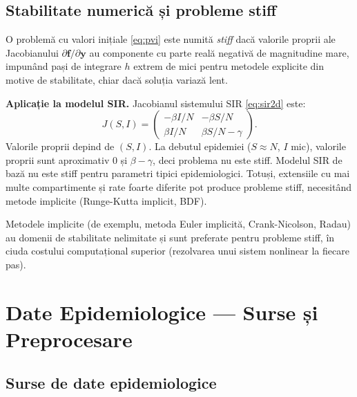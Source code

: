 \subsection{Stabilitate numerică și probleme stiff}
\label{subsec:stiff}

\begin{definitie}
\label{def:stiff}
O problemă cu valori inițiale \eqref{eq:pvi} este numită \emph{stiff} dacă
valorile proprii ale Jacobianului $\partial \mathbf{f}/\partial \mathbf{y}$ au
componente cu parte reală negativă de magnitudine mare, impunând pași de
integrare $h$ extrem de mici pentru metodele explicite din motive de stabilitate,
chiar dacă soluția variază lent.
\end{definitie}

\textbf{Aplicație la modelul SIR.} Jacobianul sistemului SIR \eqref{eq:sir2d} este:
\begin{equation}
    J(S, I) = \begin{pmatrix}
        -\beta I/N & -\beta S/N \\
        \beta I/N & \beta S/N - \gamma
    \end{pmatrix}.
\end{equation}
Valorile proprii depind de $(S, I)$. La debutul epidemiei ($S \approx N$, $I$ mic),
valorile proprii sunt aproximativ $0$ și $\beta - \gamma$, deci problema nu este
stiff. Modelul SIR de bază nu este stiff pentru parametri tipici epidemiologici.
Totuși, extensiile cu mai multe compartimente și rate foarte diferite pot
produce probleme stiff, necesitând metode implicite (Runge-Kutta implicit, BDF).

\begin{observatie}
Metodele implicite (de exemplu, metoda Euler implicită, Crank-Nicolson, Radau)
au domenii de stabilitate nelimitate și sunt preferate pentru probleme stiff,
în ciuda costului computațional superior (rezolvarea unui sistem nonlinear
la fiecare pas).
\end{observatie}

\section{Date Epidemiologice — Surse și Preprocesare}
\label{sec:date_epidemiologice}

\subsection{Surse de date epidemiologice}
\label{subsec:surse_date}

